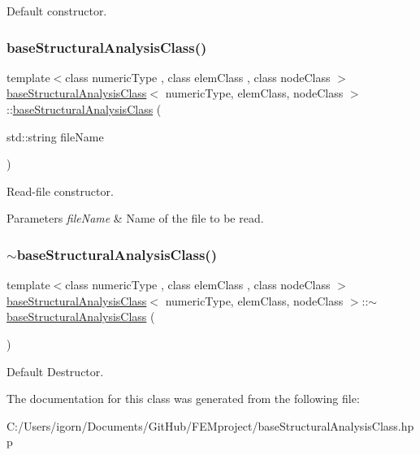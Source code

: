 Default constructor. \mbox{\label{classbase_structural_analysis_class_ac51091bf5f718cdc746c20d9cd5a0cab}} 
\subsubsection{\texorpdfstring{base\+Structural\+Analysis\+Class()}{baseStructuralAnalysisClass()}\hspace{0.1cm}{\footnotesize\ttfamily [2/2]}}
{\footnotesize\ttfamily template$<$class numeric\+Type , class elem\+Class , class node\+Class $>$ \\
\mbox{\hyperlink{classbase_structural_analysis_class}{base\+Structural\+Analysis\+Class}}$<$ numeric\+Type, elem\+Class, node\+Class $>$\+::\mbox{\hyperlink{classbase_structural_analysis_class}{base\+Structural\+Analysis\+Class}} (\begin{DoxyParamCaption}\item[{std\+::string}]{file\+Name }\end{DoxyParamCaption})\hspace{0.3cm}{\ttfamily [explicit]}}

Read-\/file constructor. 
\begin{DoxyParams}{Parameters}
{\em file\+Name} & Name of the file to be read. \\
\hline
\end{DoxyParams}
\mbox{\label{classbase_structural_analysis_class_a70a5a3407cdeb6f32f69fb1fd7ba6e75}} 
\subsubsection{\texorpdfstring{$\sim$base\+Structural\+Analysis\+Class()}{~baseStructuralAnalysisClass()}}
{\footnotesize\ttfamily template$<$class numeric\+Type , class elem\+Class , class node\+Class $>$ \\
\mbox{\hyperlink{classbase_structural_analysis_class}{base\+Structural\+Analysis\+Class}}$<$ numeric\+Type, elem\+Class, node\+Class $>$\+::$\sim$\mbox{\hyperlink{classbase_structural_analysis_class}{base\+Structural\+Analysis\+Class}} (\begin{DoxyParamCaption}{ }\end{DoxyParamCaption})\hspace{0.3cm}{\ttfamily [inline]}}

Default Destructor. 

The documentation for this class was generated from the following file\+:\begin{DoxyCompactItemize}
\item 
C\+:/\+Users/igorn/\+Documents/\+Git\+Hub/\+F\+E\+Mproject/base\+Structural\+Analysis\+Class.\+hpp\end{DoxyCompactItemize}
